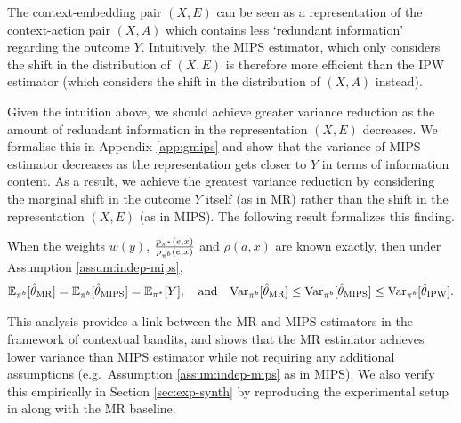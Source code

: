 The context-embedding pair $(X, E)$ can be seen as a representation of the context-action pair $(X, A)$ which contains less `redundant information' regarding the outcome $Y$. Intuitively, the MIPS estimator, which only considers the shift in the distribution of $(X, E)$ is therefore more efficient than the IPW estimator (which considers the shift in the distribution of $(X, A)$ instead). 

Given the intuition above, we should achieve greater variance reduction as the amount of redundant information in the representation $(X, E)$ decreases. We formalise this in Appendix \ref{app:gmips} and show that the variance of MIPS estimator decreases as the representation gets closer to $Y$ in terms of information content. As a result, we achieve the greatest variance reduction by considering the marginal shift in the outcome $Y$ itself (as in MR) rather than the shift in the representation $(X, E)$ (as in MIPS). The following result formalizes this finding. 
\begin{theorem}\label{prop:mips_main_text}
    When the weights $w(y)$, $\frac{p_{\pi^*}(e, x)}{p_{\pi^b}(e, x)}$ and $\rho(a, x)$ are known exactly, then under Assumption \ref{assum:indep-mips}, 
    \begin{align*}
        \mathbb{E}_{\pi^b}[\hat{\theta}_{\textup{MR}}] = \mathbb{E}_{\pi^b}[\hat{\theta}_{\textup{MIPS}}] = \mathbb{E}_{\pi^*}[Y], \quad \textup{and} \quad \textup{Var}_{\pi^b}[\hat{\theta}_{\textup{MR}}] \leq \textup{Var}_{\pi^b}[\hat{\theta}_{\textup{MIPS}}] \leq \textup{Var}_{\pi^b}[\hat{\theta}_{\textup{IPW}}].
    \end{align*}
\end{theorem}
This analysis provides a link between the MR and MIPS estimators in the framework of contextual bandits, and shows that the MR estimator achieves lower variance than MIPS estimator while not requiring any additional assumptions (e.g.\ Assumption \ref{assum:indep-mips} as in MIPS). We also verify this empirically in Section \ref{sec:exp-synth} by reproducing the experimental setup in \cite{saito2022off} along with the MR baseline.

